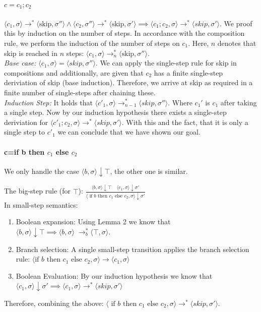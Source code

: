 \paragraph{$c = c_1;c_2$}
 $\langle c_1, \sigma\rangle \rightarrow^{*} \langle \text{skip}, \sigma''\rangle \land \langle c_2, \sigma''\rangle \rightarrow^{*} \langle \text{skip}, \sigma'\rangle \implies \langle c_1; c_2,\sigma\rangle \to^{*} \langle skip, \sigma' \rangle$. 
We proof this by induction on the number of steps. In accordance with the composition rule, we perform the induction of the number of steps on $c_1$. Here, $n$ denotes that skip is reached in $n$ steps: $\langle c_1, \sigma\rangle \rightarrow^{*}_n \langle \text{skip}, \sigma''\rangle $. \\ 
\textit{Base case:} $\langle c_1, \sigma \rangle = \langle skip, \sigma'' \rangle$. We can apply the single-step rule for skip in compositions and additionally, are given that $c_2$ has a finite single-step deriviation of skip (base induction). Therefore, we arrive at skip as required in a finite number of single-steps after chaining these. \\
\textit{Induction Step:} It holds that $\langle c'_1, \sigma\rangle \to^{*}_{n-1} \langle skip, \sigma'' \rangle$. Where $c_1'$ is $c_1$ after taking a single step. Now by our induction hypothesis there exists a single-step deriviation for $\langle c'_1;c_2, \sigma\rangle \to^{*} \langle skip, \sigma' \rangle$. With this and the fact, that it is only a single step to $c'_1$ we can conclude that we have shown our goal.

\paragraph{c=if b then $c_1$ else $c_2$}
We only handle the case $\langle b, \sigma \rangle \downarrow \top$, the other one is similar.

The big-step rule (for $\top$): $\frac{\langle b, \sigma\rangle \downarrow \top \quad \langle c_1, \sigma \rangle \downarrow \sigma'}{\langle \text{ if } b \text{ then } c_1 \text{ else } c_2, \sigma \rangle \downarrow \sigma'}$ \\
In small-step semantics: 
\begin{enumerate}
    \item Boolean expansion: Using Lemma 2 we know that $\langle b, \sigma \rangle \downarrow \top \implies \langle b, \sigma \rangle \;\to_b^{*} \langle \top, \sigma \rangle.$
    \item Branch selection: A single small-step transition applies the branch selection rule:
    $\langle \text{if } b \text{ then } c_1 \text{ else } c_2 , \sigma\rangle \rightarrow \langle c_1, \sigma\rangle $
    \item Boolean Evaluation: By our induction hypothesis we know that $ \langle c_1, \sigma \rangle \downarrow \sigma' \implies \langle c_1, \sigma \rangle \to^{*} \langle skip, \sigma'\rangle $
\end{enumerate}
Therefore, combining the above:
$\langle \text{ if } b \text{ then } c_1 \text{ else } c_2, \sigma \rangle \to^{*} \langle skip, \sigma' \rangle$.
